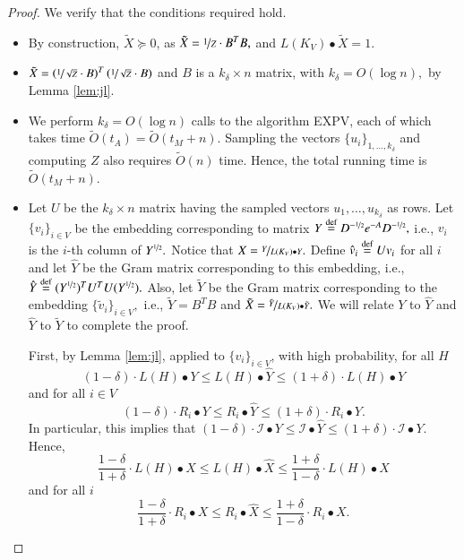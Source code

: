 \documentclass[twoside,leqno,twocolumn]{article}
\newcommand{\nfrac}{\nicefrac}
\renewcommand{\leq}{\leqslant}
\newcommand{\cI}{\mathcal I}
\newcommand{\defeq}{\stackrel{\textup{def}}{=}}
\newcommand{\Degin}{D^{-\nfrac{1}{2}}}
\numberwithin{equation}{section}
\begin{document}
\begin{proof}
We verify that the conditions required hold.
\begin{itemize}
\item By construction, $\tilde{X} \succeq 0$, as $\tilde{X} = \nfrac{1}{Z} \cdot B^T B,$ and $L(K_V) \bullet \tilde{X} = 1.$
\item $\tilde{X}=\left(\nfrac{1}{\sqrt{Z}} \cdot B\right)^T\left(\nfrac{1}{\sqrt{Z}} \cdot B
\right)$ and $B$ is a $k_\delta \times n$ matrix, with $k_\delta = O(\log n),$ by Lemma \ref{lem:jl}.
\item We perform $k_{\delta} = O(\log n)$ calls to the algorithm {\sf EXPV}, each of which takes time $\tilde{O}(t_A)=\tilde{O}(t_M + n).$ Sampling the vectors $\{u_i\}_{1,\ldots, k_\delta}$ and computing $Z$ also requires $\tilde{O}(n)$ time. Hence, the total running time is $\tilde{O}(t_M +n).$

\item Let $U$ be the $k_\delta \times n$ matrix having the sampled vectors $u_1, \ldots, u_{k_\delta}$ as rows. 
Let $\{v_i\}_{i \in V}$
be the embedding corresponding to matrix $Y \defeq \Degin e^{-A} \Degin,$ i.e., $v_i$ is the $i$-th column of $Y^{\nfrac{1}{2}}.$ Notice that $X= \nfrac{Y}{L(K_V) \bullet Y}.$
Define $\hat{v}_i \defeq Uv_i$ for all $i$ and let $\hat{Y}$ be the Gram matrix corresponding to this embedding, i.e., $\hat{Y} \defeq (Y^{\nfrac{1}{2}})^TU^TU(Y^{\nfrac{1}{2}}).$
Also, let $\tilde{Y}$ be the Gram matrix corresponding to the embedding $\{\tilde{v}_i\}_{i\in V},$ i.e., $\tilde{Y} = B^T B$ and $\tilde{X} = \nfrac{\tilde{Y}}{L(K_V) \bullet \tilde{Y}}.$
We will relate $Y$ to $\hat{Y}$ and $\hat{Y}$ to $\tilde{Y}$ to complete the proof.

First, by Lemma \ref{lem:jl}, applied to $\{v_i\}_{i \in V}$, with high probability, for all $H$
$$
(1-\delta) \cdot L(H) \bullet Y \leq L(H) \bullet \hat{Y} \leq (1+\delta) \cdot L(H) \bullet Y
$$
and for all $i \in V$
$$
(1-\delta) \cdot  R_i \bullet Y \leq R_i \bullet \hat{Y} \leq (1+\delta) \cdot R_i \bullet  Y.
$$
In particular, this implies that $ (1-\delta) \cdot \cI \bullet Y \leq \cI \bullet \hat{Y} \leq (1 + \delta) \cdot \cI \bullet Y.$
Hence,
$$
\frac{1-\delta}{1+\delta} \cdot L(H) \bullet X \leq L(H) \bullet \hat{X} \leq \frac{1+\delta}{1-\delta} \cdot L(H) \bullet X
$$
and for all $i$
$$
\frac{1-\delta}{1+\delta} \cdot  R_i \bullet X \leq R_i \bullet \hat{X} \leq \frac{1+\delta}{1-\delta} \cdot R_i \bullet X.
$$


\end{itemize}
\end{proof}
\end{document}
